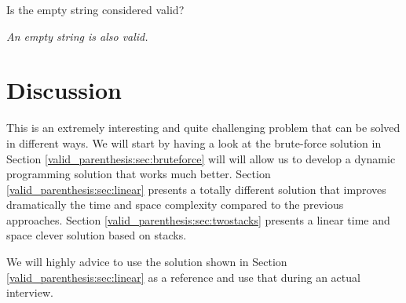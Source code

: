 \begin{QandA}
	\item Is the empty string considered valid?
	\begin{answered}
		\textit{An empty string is also valid.}
	\end{answered}
	
\end{QandA}

\section{Discussion}
\label{valid_parenthesis:sec:discussion}
This is an extremely interesting and quite challenging problem that can be solved in different ways. We will start by having a look at the brute-force solution in Section \ref{valid_parenthesis:sec:bruteforce} will will allow us to develop a dynamic programming solution that works much better. Section \ref{valid_parenthesis:sec:linear} presents a totally different solution that improves dramatically the time and space complexity compared to the previous approaches. Section \ref{valid_parenthesis:sec:twostacks} presents a linear time and space clever solution based on stacks.

We will highly advice to use the solution shown in Section \ref{valid_parenthesis:sec:linear} as a reference and use that during an actual interview.

